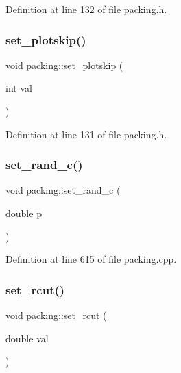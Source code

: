 Definition at line 132 of file packing.\+h.

\mbox{\label{classpacking_a9c34cb0d24ff7bf013c19f801591c646}} 
\subsubsection{\texorpdfstring{set\+\_\+plotskip()}{set\_plotskip()}}
{\footnotesize\ttfamily void packing\+::set\+\_\+plotskip (\begin{DoxyParamCaption}\item[{int}]{val }\end{DoxyParamCaption})\hspace{0.3cm}{\ttfamily [inline]}}



Definition at line 131 of file packing.\+h.

\mbox{\label{classpacking_ab1b640756b858f5df25d88ab841300b2}} 
\subsubsection{\texorpdfstring{set\+\_\+rand\+\_\+c()}{set\_rand\_c()}}
{\footnotesize\ttfamily void packing\+::set\+\_\+rand\+\_\+c (\begin{DoxyParamCaption}\item[{double}]{p }\end{DoxyParamCaption})}



Definition at line 615 of file packing.\+cpp.

\mbox{\label{classpacking_a073820579ccf298710943fefe023d853}} 
\subsubsection{\texorpdfstring{set\+\_\+rcut()}{set\_rcut()}}
{\footnotesize\ttfamily void packing\+::set\+\_\+rcut (\begin{DoxyParamCaption}\item[{double}]{val }\end{DoxyParamCaption})\hspace{0.3cm}{\ttfamily [inline]}}



